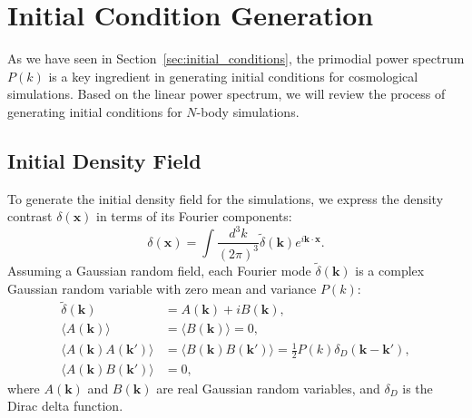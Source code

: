 \section{Initial Condition Generation}
As we have seen in Section~\ref{sec:initial_conditions}, the primodial power spectrum $P(k)$ is a key ingredient in generating initial conditions for cosmological simulations. Based on the linear power spectrum, we will review the process of generating initial conditions for $N$-body simulations.

\subsection{Initial Density Field}
To generate the initial density field for the simulations, we express the density contrast $\delta(\mathbf{x})$ in terms of its Fourier components:
\begin{equation}
    \delta(\mathbf{x}) = \int \frac{d^3k}{(2\pi)^3} \tilde{\delta}(\mathbf{k}) e^{i\mathbf{k} \cdot \mathbf{x}}.
\end{equation}
Assuming a Gaussian random field, each Fourier mode $\tilde{\delta}(\mathbf{k})$ is a complex Gaussian random variable with zero mean and variance $P(k)$:
\begin{align}
    \tilde{\delta}(\mathbf{k}) &= A(\mathbf{k}) + i B(\mathbf{k}), \\
    \langle A(\mathbf{k}) \rangle &= \langle B(\mathbf{k}) \rangle = 0, \\
    \langle A(\mathbf{k}) A(\mathbf{k}') \rangle &= \langle B(\mathbf{k}) B(\mathbf{k}') \rangle = \frac{1}{2} P(k) \delta_D(\mathbf{k} - \mathbf{k}'), \\
    \langle A(\mathbf{k}) B(\mathbf{k}') \rangle &= 0,
\end{align}
where $A(\mathbf{k})$ and $B(\mathbf{k})$ are real Gaussian random variables, and $\delta_D$ is the Dirac delta function.

